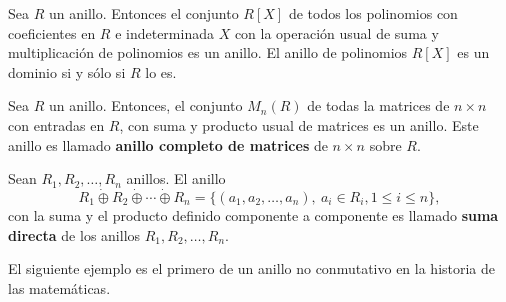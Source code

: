 \begin{ejemplo}
Sea $R$ un anillo. Entonces el conjunto $R[X]$ de todos los polinomios con coeficientes en $R$ e indeterminada  $X$ con la operación usual de suma y multiplicación de polinomios es un anillo. El anillo de polinomios $R[X]$ es un dominio si y sólo si $R$ lo es. 
\end{ejemplo}
\begin{ejemplo}
Sea $R$ un anillo. Entonces, el conjunto $M_n(R)$ de todas la matrices de $n\times n$ con entradas en $R$, con suma y producto usual de matrices es un anillo. Este anillo es llamado \textbf{anillo completo de matrices} de $n\times n$ sobre $R$.
\end{ejemplo}
\begin{ejemplo}
Sean $R_1, R_2, \dots, R_n$ anillos. El anillo \[ R_1\dot{\oplus}R_2\dot{\oplus}\cdots\dot{\oplus} R_n = \{ (a_1,a_2,\dots,a_n),\   a_i \in R_i, 1\leq i \leq n \},  \] con la suma y el producto definido componente a componente es llamado  \textbf{suma directa} de los anillos $R_1, R_2,\dots,R_n$.
\end{ejemplo}
El siguiente ejemplo es el primero de un anillo no conmutativo en la historia de las matemáticas. 
